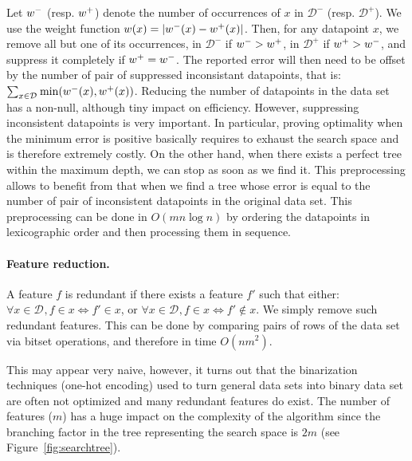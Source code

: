 \documentclass{llncs}
\def\posclass{+}
\def\negclass{-}
\def\datasymb{D}
\newcommand{\setex}[1]{\ensuremath{{\mathcal \datasymb}^{#1}}\xspace}
\newcommand{\allex}{{\setex{}}\xspace}
\newcommand{\afeat}[0]{\ensuremath{f}}
\newcommand{\weight}[1][]{\ensuremath{\ifthenelse{\equal{#1}{}}{w}{w({#1})}}}
\newcommand{\numex}[0]{\ensuremath{n}}
\newcommand{\numfeat}[0]{\ensuremath{m}}
\begin{document}
Let $\weight^{\negclass}$ (resp. $\weight^{\posclass}$) denote the number of occurrences of $x$ in $\setex{\negclass}$ (resp. $\setex{\posclass}$). We use the weight function $\weight[x] = |\weight^{\negclass}(x) - \weight^{\posclass}(x)|$. Then, for any datapoint $x$, we remove all but one of its occurrences, in $\setex{\negclass}$ if $\weight^{\negclass}>\weight^{\posclass}$, in $\setex{\posclass}$ if $\weight^{\posclass}>\weight^{\negclass}$, and suppress it completely if $\weight^{\posclass}=\weight^{\negclass}$.
The reported error will then need to be offset by the number of pair of suppressed inconsistant datapoints, that is:
$
\sum_{x \in \allex}\min(\weight^{\negclass}(x), \weight^{\posclass}(x))
$.
Reducing the number of datapoints in the data set has a non-null, although tiny impact on efficiency. However, suppressing inconsistent datapoints is very important. In particular, proving optimality when the minimum error is positive basically requires to exhaust the search space and is therefore extremely costly. On the other hand, when there exists a perfect tree within the maximum depth, we can stop as soon as we find it. This preprocessing allows to benefit from that when we find a tree whose error is equal to the number of pair of inconsistent datapoints in the original data set.
This preprocessing can be done in $O(\numfeat \numex \log \numex)$ by ordering the datapoints in lexicographic order and then processing them in sequence.

\paragraph{Feature reduction.}

A feature $\afeat$ is redundant if there exists a feature $\afeat'$ such that either: $\forall x \in \allex, \afeat \in x \iff \afeat' \in x$, or $\forall x \in \allex, \afeat \in x \iff \afeat' \not\in x$. We simply remove such redundant features. This can be done by comparing pairs of rows of the data set via bitset operations, and therefore in time $O(\numex\numfeat^2)$.

This may appear very naive, however, it turns out that the binarization techniques (one-hot encoding) used to turn general data sets into binary data set are often not optimized and many redundant features do exist. The number of features ($\numfeat$) has a huge impact on the complexity of the algorithm since the branching factor in the tree representing the search space is $2\numfeat$ (see Figure~\ref{fig:searchtree}).
\end{document}
